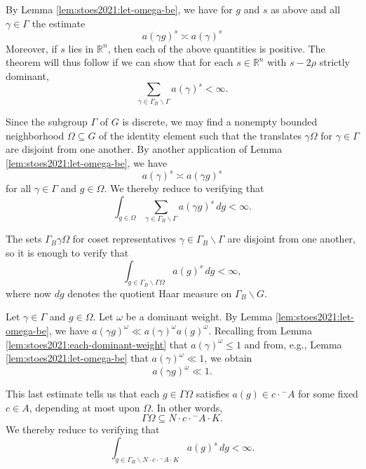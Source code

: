 \documentclass[reqno]{amsart} 
\begin{document}
By Lemma \ref{lem:stoes2021:let-omega-be}, we have for $g$ and $s$ as above and all $\gamma \in \Gamma$ the estimate
\begin{equation*}
  a(\gamma g) ^s  \asymp a (\gamma) ^s
\end{equation*}
Moreover, if $s$ lies in $\mathbb{R}^n$, then each of the above quantities is positive.  The theorem will thus follow if we can show that for each $s \in \mathbb{R}^n $ with $s - 2 \rho $ strictly dominant,
\begin{equation*}
  \sum _{\gamma \in \Gamma_B \backslash \Gamma } a (\gamma ) ^s < \infty.
\end{equation*}

Since the subgroup $\Gamma$ of $G$ is discrete, we may find a nonempty bounded neighborhood $\Omega \subseteq G$ of the identity element such that the translates $\gamma \Omega$ for $\gamma \in \Gamma$ are disjoint from one another.  By another application of Lemma \ref{lem:stoes2021:let-omega-be}, we have
\begin{equation*}
  a(\gamma)^s \asymp a(\gamma g)^s
\end{equation*}
for all $\gamma \in \Gamma$ and $g \in \Omega$.  We thereby reduce to verifying that
\begin{equation*}
  \int _{g \in \Omega }\sum _{\gamma \in \Gamma_B \backslash \Gamma } a (\gamma g ) ^s \, d g < \infty.
\end{equation*}

The sets $\Gamma_B \gamma \Omega$ for coset representatives $\gamma \in \Gamma_B \backslash \Gamma$ are disjoint from one another, so it is enough to verify that
\begin{equation*}
  \int _{g \in \Gamma_B \backslash \Gamma \Omega} a (g) ^s \,d g < \infty ,
\end{equation*}
where now $d g$ denotes the quotient Haar measure on $\Gamma _B \backslash G$.

Let $\gamma \in \Gamma$ and $g \in \Omega$.  Let $\omega$ be a dominant weight.  By Lemma \ref{lem:stoes2021:let-omega-be}, we have $a(\gamma g)^{\omega} \ll a(\gamma)^{\omega} a(g)^{\omega}$.  Recalling from Lemma \ref{lem:stoes2021:each-dominant-weight} that $a(\gamma)^{\omega} \leq 1$ and from, e.g., Lemma \ref{lem:stoes2021:let-omega-be} that $a(\gamma)^{\omega} \ll 1$, we obtain
\begin{equation*}
  a(\gamma g)^{\omega} \ll 1.
\end{equation*}

This last estimate tells us that each $g \in \Gamma \Omega$ satisfies $a(g) \in c \cdot {}^- A$ for some fixed $c \in A$, depending at most upon $\Omega$.  In other words,
\begin{equation*}
  \Gamma \Omega \subseteq N \cdot c \cdot {}^- A \cdot K.
\end{equation*}
We thereby reduce to verifying that
\begin{equation*}
  \int _{g \in \Gamma_B \backslash N \cdot c \cdot {}^- A \cdot K} a(g)^s \, d g < \infty.
\end{equation*}
\end{document}
